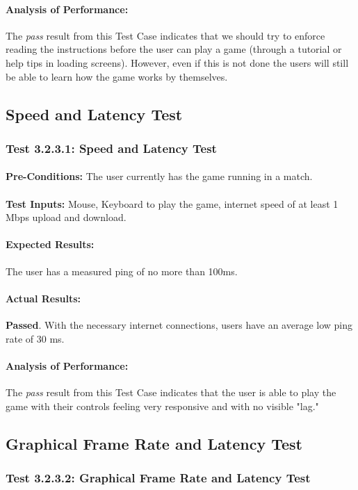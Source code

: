 \documentclass{article}
\begin{document}
    \paragraph{Analysis of Performance:} The \emph{pass} result from this Test Case indicates that we should try to enforce reading the instructions before the user can play a game (through a tutorial or help tips in loading screens). However, even if this is not done the users will still be able to learn how the game works by themselves.
\subsection{Speed and Latency Test}
\subsubsection{Test 3.2.3.1: Speed and Latency Test }
    \paragraph{}\textbf{Pre-Conditions:} The user currently has the game running in a match.
    \paragraph{}\textbf{Test Inputs:} Mouse, Keyboard to play the game, internet speed of at least 1 Mbps upload and download.
    \paragraph{Expected Results:} The user has a measured ping of no more than 100ms.
    \paragraph{Actual Results:} \textbf{Passed}. With the necessary internet connections, users have an average low ping rate of 30 ms. 
    \paragraph{Analysis of Performance:} The \emph{pass} result from this Test Case indicates that the user is able to play the game with their controls feeling very responsive and with no visible "lag."
\subsection{Graphical Frame Rate and Latency Test}
\subsubsection{Test 3.2.3.2: Graphical Frame Rate and Latency Test }
\end{document}
